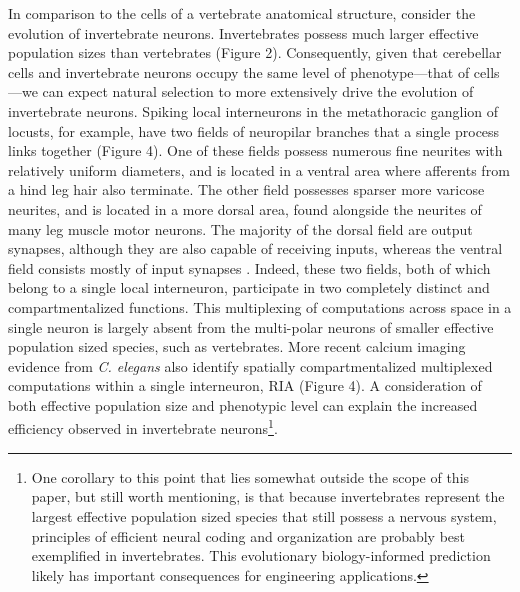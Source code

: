 \documentclass[twocolumn]{article}
\begin{document}
In comparison to the cells of a vertebrate anatomical structure, consider the evolution of invertebrate neurons. Invertebrates possess much larger effective population sizes than vertebrates (Figure 2). Consequently, given that cerebellar cells and invertebrate neurons occupy the same level of phenotype---that of cells---we can expect natural selection to more extensively drive the evolution of invertebrate neurons. Spiking local interneurons in the metathoracic ganglion of locusts, for example, have two fields of neuropilar branches that a single process links together (Figure 4). One of these fields possess numerous fine neurites with relatively uniform diameters, and is located in a ventral area where afferents from a hind leg hair also terminate. The other field possesses sparser more varicose neurites, and is located in a more dorsal area, found alongside the neurites of many leg muscle motor neurons. The majority of the dorsal field are output synapses, although they are also capable of receiving inputs, whereas the ventral field consists mostly of input synapses \cite{watson_burrows_1985}. Indeed, these two fields, both of which belong to a single local interneuron, participate in two completely distinct and compartmentalized functions. This multiplexing of computations across space in a single neuron is largely absent from the multi-polar neurons of smaller effective population sized species, such as vertebrates. More recent calcium imaging evidence from \textit{C. elegans} also identify spatially compartmentalized multiplexed computations within a single interneuron, RIA \cite{Hendricks_Ha_Maffey_Zhang_2012} (Figure 4). A consideration of both effective population size and phenotypic level can explain the increased efficiency observed in invertebrate neurons\footnote{One corollary to this point that lies somewhat outside the scope of this paper, but still worth mentioning, is that because invertebrates represent the largest effective population sized species that still possess a nervous system, principles of efficient neural coding and organization are probably best exemplified in invertebrates. This evolutionary biology-informed prediction likely has important consequences for engineering applications.}. 
\end{document}
